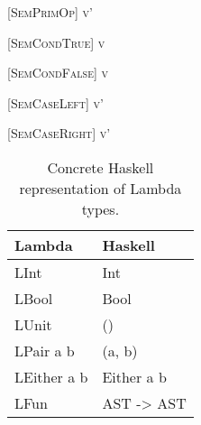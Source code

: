 \begin{prooftree*}
  [\scshape SemPrimOp]{ \Downarrow v'}
\end{prooftree*}

\begin{prooftree*}
  [\scshape SemCondTrue]{ \Downarrow v}
\end{prooftree*}

\begin{prooftree*}
  [\scshape SemCondFalse]{ \Downarrow v}
\end{prooftree*}

\begin{prooftree*}
  [\scshape SemCaseLeft]{ \Downarrow v'}
\end{prooftree*}

\begin{prooftree*}
  [\scshape SemCaseRight]{ \Downarrow v'}
\end{prooftree*}

\begin{table}[ht]
  \centering
  \begin{tabular}[t]{ll}
    Lambda      & Haskell    \\
    \midrule
    LInt        & Int        \\
    LBool       & Bool       \\
    LUnit       & ()         \\
    LPair a b   & (a, b)     \\
    LEither a b & Either a b \\
    LFun        & AST -> AST \\
  \end{tabular}
  \caption{Concrete Haskell representation of Lambda types.}
\end{table}
